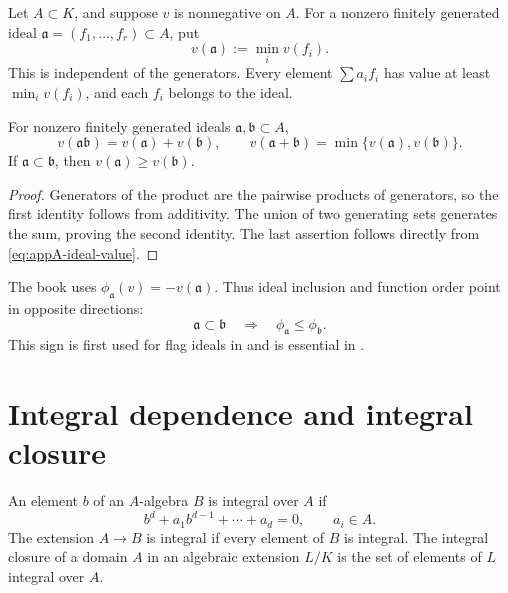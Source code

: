 Let \(A\subset K\), and suppose \(v\) is nonnegative on \(A\).  For a
nonzero finitely generated ideal
\(\mathfrak a=(f_1,\ldots,f_r)\subset A\), put
\begin{equation*}
 v(\mathfrak a):=\min_i v(f_i).
 \tag{A.1}\label{eq:appA-ideal-value}
\end{equation*}
This is independent of the generators.  Every element
\(\sum a_if_i\) has value at least \(\min_i v(f_i)\), and each \(f_i\)
belongs to the ideal.

\begin{proposition}\label{prop:appA-ideal-arithmetic}
For nonzero finitely generated ideals \(\mathfrak a,\mathfrak b\subset A\),
\[
 v(\mathfrak a\mathfrak b)=v(\mathfrak a)+v(\mathfrak b),\qquad
 v(\mathfrak a+\mathfrak b)
   =\min\{v(\mathfrak a),v(\mathfrak b)\}.
\]
If \(\mathfrak a\subset\mathfrak b\), then
\(v(\mathfrak a)\geq v(\mathfrak b)\).
\end{proposition}

\begin{proof}
Generators of the product are the pairwise products of generators, so the
first identity follows from additivity.  The union of two generating sets
generates the sum, proving the second identity.  The last assertion follows
directly from \eqref{eq:appA-ideal-value}.
\end{proof}

\begin{remark}[Checkpoint]
\label{rem:appA-ideal-sign}
The book uses \(\phi_{\mathfrak a}(v)=-v(\mathfrak a)\).  Thus ideal
inclusion and function order point in opposite directions:
\[
 \mathfrak a\subset\mathfrak b
 \quad\Longrightarrow\quad
 \phi_{\mathfrak a}\leq\phi_{\mathfrak b}.
\]
This sign is first used for flag ideals in
 and is essential in
.
\end{remark}

\section{Integral dependence and integral closure}
\label{sec:appA-integral-dependence}

\begin{definition}
\label{def:appA-integral-element}
An element \(b\) of an \(A\)-algebra \(B\) is integral over \(A\) if
\[
 b^d+a_1b^{d-1}+\cdots+a_d=0,\qquad a_i\in A.
\]
The extension \(A\to B\) is integral if every element of \(B\) is integral.
The integral closure of a domain \(A\) in an algebraic extension \(L/K\)
is the set of elements of \(L\) integral over \(A\).
\end{definition}

